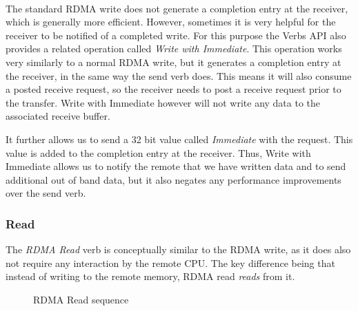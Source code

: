 \paragraph{} The standard RDMA write does not generate a completion entry at the receiver, which is generally more efficient.
However, sometimes it is very helpful for the receiver to be notified of a completed write. For this purpose the Verbs API 
also provides a related operation called \emph{Write with Immediate}.
This operation works very similarly to a normal RDMA write, but it generates a completion entry at the receiver, in the same way 
the send verb does. This means it will also consume a posted receive request, so the receiver needs to post a receive request 
prior to the transfer. Write with Immediate however will not write any data to the associated receive buffer.

It further allows us to send a 32 bit value called \emph{Immediate} with the request. This value is added to
the completion entry at the receiver. Thus, Write with Immediate allows us to notify the remote that we have written data and to 
send additional out of band data, but it also negates any performance improvements over the send verb.


\subsubsection{Read}

The \emph{RDMA Read} verb is conceptually similar to the RDMA write, as it does also not require any interaction by the 
remote CPU. The key difference being that instead of writing to the remote memory, RDMA read \emph{reads} from it.


\begin{figure}[!htp]
\begin{center}
\end{center}
\caption{RDMA Read sequence}
\label{fig:seq-rd}
\end{figure}

